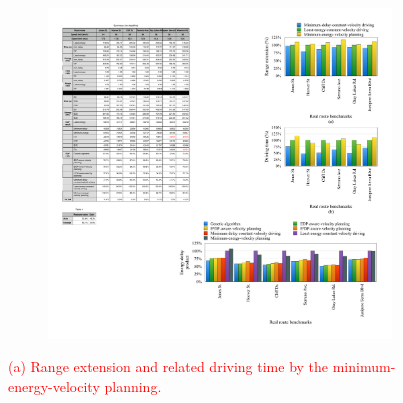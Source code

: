 \documentclass{IEEEtran}
\begin{document}
\begin{figure}
\begin{subfigure}{0.47\textwidth}
	\includegraphics[width=\hsize]{Figures/driving_time_comp_bar.pdf}
	\caption{}
	\label{fig:driving_time_comp}
	\end{subfigure}
\caption{\textcolor{red}{(a) Range extension and related driving time by the minimum-energy-velocity planning.}}
\label{fig:min_energy_planning_comp}
\end{figure}

%
\end{document}
